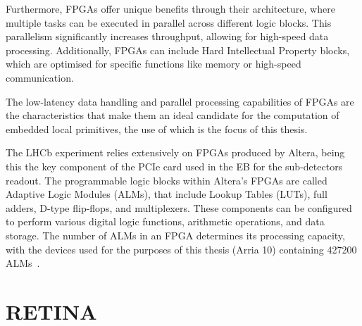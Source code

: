 Furthermore, FPGAs offer unique benefits through their architecture, where multiple tasks can be executed in parallel across different logic blocks. This parallelism significantly increases throughput, allowing for high-speed data processing. Additionally, FPGAs can include Hard Intellectual Property blocks, which are optimised for specific functions like memory or high-speed communication.

The low-latency data handling and parallel processing capabilities of FPGAs are the characteristics that make them an ideal candidate for the computation of embedded local primitives, the use of which is the focus of this thesis.

The LHCb experiment relies extensively on FPGAs produced by Altera, being this the key component of the PCIe card used in the EB for the sub-detectors readout. The programmable logic blocks within Altera's FPGAs are called Adaptive Logic Modules (ALMs), that include Lookup Tables (LUTs), full adders, D-type flip-flops, and multiplexers. These components can be configured to perform various digital logic functions, arithmetic operations, and data storage. The number of ALMs in an FPGA determines its processing capacity, with the devices used for the purposes of this thesis (Arria 10) containing 427200 ALMs~\cite{arria10}.




\section{RETINA}

